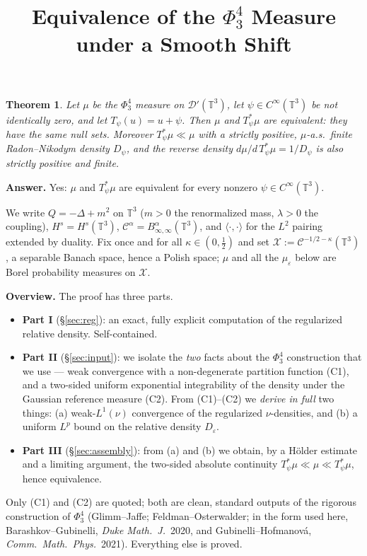 \documentclass[12pt]{article}
\title{Equivalence of the $\Phi^4_3$ Measure under a Smooth Shift}
\author{}
\date{}
\newcommand{\bT}{\mathbb{T}}
\newcommand{\Dp}{\mathcal{D}'}
\newcommand{\eps}{\varepsilon}
\newcommand{\kp}{\kappa}
\theoremstyle{plain}
\newtheorem{theorem}{Theorem}
\theoremstyle{definition}
\begin{document}
\maketitle

\begin{theorem}\label{thm:main}
Let $\mu$ be the $\Phi^4_3$ measure on $\Dp(\bT^3)$, let $\psi\in C^\infty(\bT^3)$ be
not identically zero, and let $T_\psi(u)=u+\psi$. Then $\mu$ and $T_\psi^\ast\mu$ are
equivalent: they have the same null sets. Moreover $T_\psi^\ast\mu\ll\mu$ with a
strictly positive, $\mu$-a.s.\ finite Radon--Nikodym density $D_\psi$, and the reverse
density $d\mu/d\,T_\psi^\ast\mu=1/D_\psi$ is also strictly positive and finite.
\end{theorem}

\noindent\textbf{Answer.} Yes: $\mu$ and $T_\psi^\ast\mu$ are equivalent for every
nonzero $\psi\in C^\infty(\bT^3)$.

\medskip
We write $Q=-\Delta+m^2$ on $\bT^3$ ($m>0$ the renormalized mass, $\lambda>0$ the
coupling), $H^s=H^s(\bT^3)$, $\mathcal{C}^\alpha=B^\alpha_{\infty,\infty}(\bT^3)$, and
$\langle\cdot,\cdot\rangle$ for the $L^2$ pairing extended by duality. Fix once and for
all $\kp\in(0,\tfrac12)$ and set $\mathcal X:=\mathcal{C}^{-1/2-\kp}(\bT^3)$, a
separable Banach space, hence a Polish space; $\mu$ and all the $\mu_\eps$ below are
Borel probability measures on $\mathcal X$.

\medskip\noindent\textbf{Overview.} The proof has three parts.
\begin{itemize}
\item \textbf{Part I} (\S\ref{sec:reg}): an exact, fully explicit computation of the
regularized relative density. Self-contained.
\item \textbf{Part II} (\S\ref{sec:input}): we isolate the \emph{two} facts about the
$\Phi^4_3$ construction that we use --- weak convergence with a non-degenerate
partition function (C1), and a two-sided uniform exponential integrability of the
density under the Gaussian reference measure (C2). From (C1)--(C2) we \emph{derive in
full} two things: (a) weak-$L^1(\nu)$ convergence of the regularized $\nu$-densities,
and (b) a uniform $L^p$ bound on the relative density $D_\eps$.
\item \textbf{Part III} (\S\ref{sec:assembly}): from (a) and (b) we obtain, by a
H\"older estimate and a limiting argument, the two-sided absolute continuity
$T_\psi^\ast\mu\ll\mu\ll T_\psi^\ast\mu$, hence equivalence.
\end{itemize}
Only (C1) and (C2) are quoted; both are clean, standard outputs of the rigorous
construction of $\Phi^4_3$ (Glimm--Jaffe; Feldman--Osterwalder; in the form used here,
Barashkov--Gubinelli, \emph{Duke Math.\ J.}\ 2020, and Gubinelli--Hofmanov\'a,
\emph{Comm.\ Math.\ Phys.}\ 2021). Everything else is proved.
\end{document}
